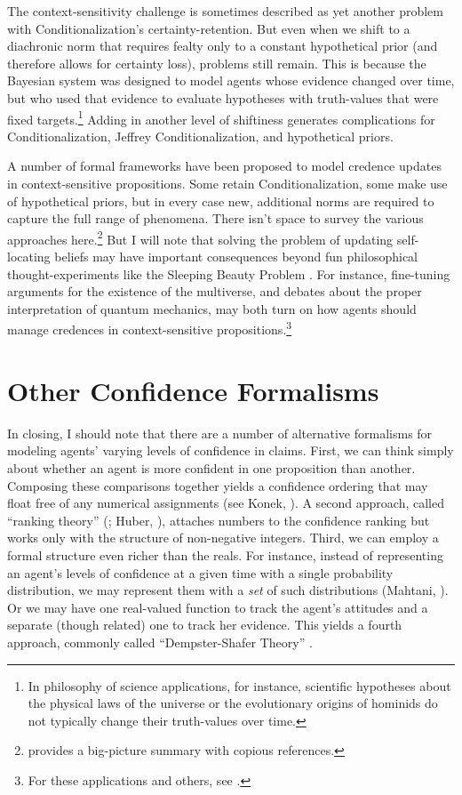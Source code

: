 The context-sensitivity challenge is sometimes described as yet another problem with Conditionalization's certainty-retention. But even when we shift to a diachronic norm that requires fealty only to a constant hypothetical prior (and therefore allows for certainty loss), problems still remain. This is because the Bayesian system was designed to model agents whose evidence changed over time, but who used that evidence to evaluate hypotheses with truth-values that were fixed targets.\footnote
{In philosophy of science applications, for instance, scientific hypotheses about the physical laws of the universe or the evolutionary origins of hominids do not typically change their truth-values over time.}
 Adding in another level of shiftiness generates complications for Conditionalization, Jeffrey Conditionalization, and hypothetical priors.
 
A number of formal frameworks have been proposed to model credence updates in context-sensitive propositions. Some retain Conditionalization, some make use of hypothetical priors, but in every case new, additional norms are required to capture the full range of phenomena. There isn't space to survey the various approaches here.\footnote
{\citet{TitelbaumSelfLocating} provides a big-picture summary with copious references.}
 But I will note that solving the problem of updating self-locating beliefs may have important consequences beyond fun philosophical thought-experiments like the Sleeping Beauty Problem \citep{ElgaBeauty}. For instance, fine-tuning arguments for the existence of the multiverse, and debates about the proper interpretation of quantum mechanics, may both turn on how agents should manage credences in context-sensitive propositions.\footnote
 {For these applications and others, see \citet{TitelbaumTenReasons}.}
 
 
\section{Other Confidence Formalisms} \label{s:extensions}
In closing, I should note that there are a number of alternative formalisms for modeling agents' varying levels of confidence in claims. First, we can think simply about whether an agent is more confident in one proposition than another. Composing these comparisons together yields a confidence ordering that may float free of any numerical assignments (see Konek, ). A second approach, called ``ranking theory'' (\citealp{SpohnLaws}; Huber, ), attaches numbers to the confidence ranking but works only with the structure of non-negative integers. Third, we can employ a formal structure even richer than the reals. For instance, instead of representing an agent's levels of confidence at a given time with a single probability distribution, we may represent them with a \emph{set} of such distributions (Mahtani, ). Or we may have one real-valued function to track the agent's attitudes and a separate (though related) one to track her evidence. This yields a fourth approach, commonly called ``Dempster-Shafer Theory'' \citep{DempsterNewMethods,ShaferMathematicalTheory}.

